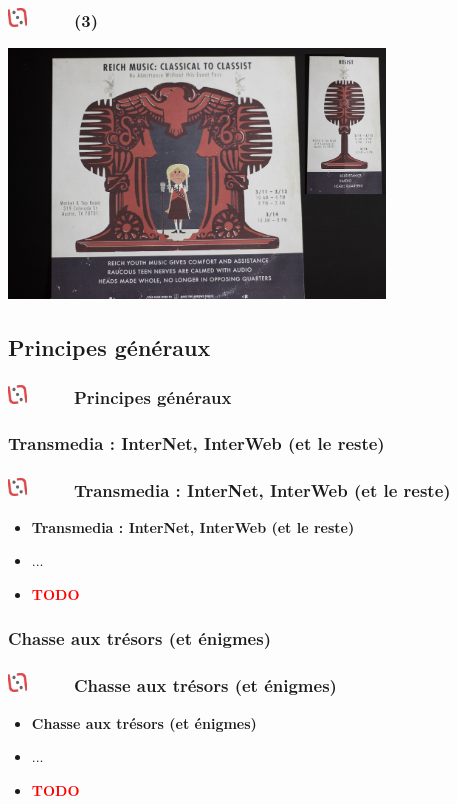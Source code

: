 \documentclass[slidetop,11pt]{beamer}
\def\moreInFrameTitleLeftt{\includegraphics[height=0.5cm]{img/ligueludique-0.png}~~~~~}
\begin{document}
\begin{frame}
	\frametitle{\moreInFrameTitleLeftt \sectionPartIIaVIII  (3) }
	\includegraphics[width=10.00cm]{img/ResistanceRadio/resistance-radio-secret-solved.jpg}~\\
\end{frame}



\def\sectionPartIIb{Principes g{\'e}n{\'e}raux}
\subsection{\sectionPartIIb} %
\begin{frame}
	\frametitle{\moreInFrameTitleLeftt \sectionPartIIb }
	\tableofcontents[sections=2,currentsection,subsectionstyle=show/shaded/hide]
\end{frame} 

\def\sectionPartIIbI{Transmedia : InterNet, InterWeb (et le reste)}
\subsubsection{\sectionPartIIbI} %
\begin{frame}
	\frametitle{\moreInFrameTitleLeftt \sectionPartIIbI }
	\begin{itemize}
		\item \textbf{ \sectionPartIIbI }
		\item[] ...
		\item \textcolor{red}{ \textbf{TODO} }
	\end{itemize}
\end{frame} 

\def\sectionPartIIbII{Chasse aux tr{\'e}sors (et {\'e}nigmes)}
\subsubsection{\sectionPartIIbII} %
\begin{frame}
	\frametitle{\moreInFrameTitleLeftt \sectionPartIIbII }
	\begin{itemize}
		\item \textbf{ \sectionPartIIbII }
		\item[] ...
		\item \textcolor{red}{ \textbf{TODO} }
	\end{itemize}
\end{frame} 
\end{document}
